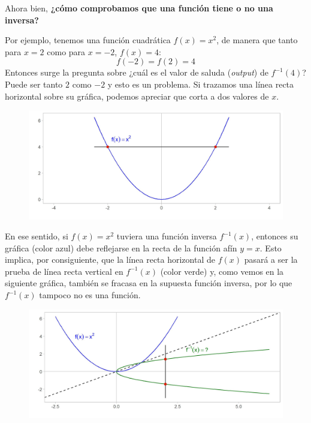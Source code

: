 \documentclass[12pt]{article}
\begin{document}
Ahora bien, \textbf{¿cómo comprobamos que una función tiene o no una inversa?}

Por ejemplo, tenemos una función cuadrática $f(x) = x^{2}$, de manera que tanto para $x = 2$ como para $x = -2$, $f(x) = 4$:
\[f(-2) = f(2) = 4\]
Entonces surge la pregunta sobre ¿cuál es el valor de saluda (\textit{output}) de $f^{-1}(4)$? Puede ser tanto $2$ como $-2$ y esto es un problema. Si trazamos una línea recta horizontal sobre su gráfica, podemos apreciar que corta a dos valores de $x$.

\begin{figure}[hbt!]
\centering
\includegraphics[scale=0.7]{img/not_one_to_one.jpg}
\end{figure}

En ese sentido, si $f(x) = x^{2}$ tuviera una función inversa $f^{-1}(x)$, entonces su gráfica (color azul) debe reflejarse en la recta de la función afín $y = x$. Esto implica, por consiguiente, que la línea recta horizontal de $f(x)$ pasará a ser la prueba de línea recta vertical en $f^{-1}(x)$ (color verde) y, como vemos en la siguiente gráfica, también se fracasa en la supuesta función inversa, por lo que $f^{-1}(x)$ tampoco no es una función.

\begin{figure}[hbt!]
\centering
\includegraphics[scale=0.7]{img/not_one_to_one_2.jpg}
\end{figure}
\end{document}
